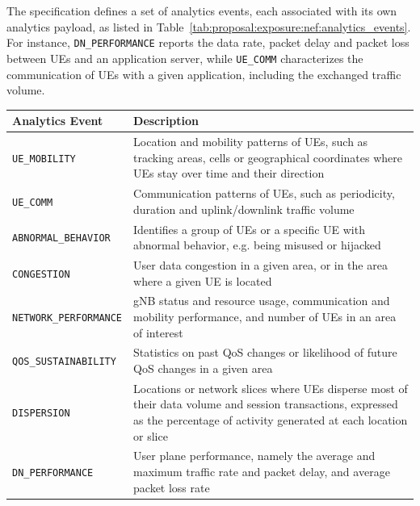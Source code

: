 The specification defines a set of analytics events, each associated with its own analytics payload, as listed in Table~\ref{tab:proposal:exposure:nef:analytics_events}. For instance, \texttt{DN\allowbreak\_PERFORMANCE} reports the data rate, packet delay and packet loss between \acsp{UE} and an application server, while \texttt{UE\allowbreak\_COMM} characterizes the communication of \acsp{UE} with a given application, including the exchanged traffic volume.

\begin{table}[htbp]
    \centering
    \renewcommand\tabularxcolumn[1]{m{#1}}
    \begin{tabularx}{\textwidth}{|
        >{\RaggedRight\arraybackslash}m{}|
        >{\RaggedRight\arraybackslash}X|}
        \hline
        \textbf{Analytics Event} & \textbf{Description} \\
        \hline
        \texttt{UE\_MOBILITY} & Location and mobility patterns of \acsp{UE}, such as tracking areas, cells or geographical coordinates where \acsp{UE} stay over time and their direction \\
        \hline
        \texttt{UE\_COMM} & Communication patterns of \acsp{UE}, such as periodicity, duration and uplink/downlink traffic volume \\
        \hline
        \texttt{ABNORMAL\allowbreak\_BEHAVIOR} & Identifies a group of \acsp{UE} or a specific \acs{UE} with abnormal behavior, e.g. being misused or hijacked \\
        \hline
        \texttt{CONGESTION} & User data congestion in a given area, or in the area where a given \acs{UE} is located \\
        \hline
        \texttt{NETWORK\allowbreak\_PERFORMANCE} & \acs{gNB} status and resource usage, communication and mobility performance, and number of \acsp{UE} in an area of interest \\
        \hline
        \texttt{QOS\allowbreak\_SUSTAINABILITY} & Statistics on past \acs{QoS} changes or likelihood of future \acs{QoS} changes in a given area \\
        \hline
        \texttt{DISPERSION} & Locations or network slices where \acsp{UE} disperse most of their data volume and session transactions, expressed as the percentage of activity generated at each location or slice\\
        \hline
        \texttt{DN\allowbreak\_PERFORMANCE} & User plane performance, namely the average and maximum traffic rate and packet delay, and average packet loss rate \\

\end{tabularx}
\end{table}
